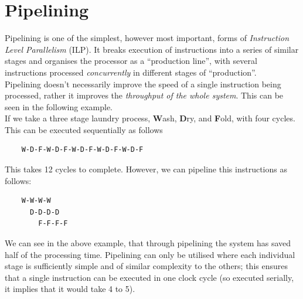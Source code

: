 
\section{Pipelining}
Pipelining is one of the simplest, however most important, forms of \textit{Instruction Level Parallelism} (ILP). It breaks execution of instructions into a series of similar stages and organises the processor as a ``production line'', with several instructions processed \textit{concurrently} in different stages of ``production''.\\

Pipelining doesn't necessarily improve the speed of a single instruction being processed, rather it improves the \textit{throughput of the whole system}. This can be seen in the following example.\\

If we take a three stage laundry process, \textbf{W}ash, \textbf{D}ry, and \textbf{F}old, with four cycles. This can be executed sequentially as follows
\begin{verbatim}
    W-D-F-W-D-F-W-D-F-W-D-F-W-D-F
\end{verbatim}
This takes 12 cycles to complete. However, we can pipeline this instructions as follows:
\begin{verbatim}
    W-W-W-W
      D-D-D-D
        F-F-F-F
\end{verbatim}
We can see in the above example, that through pipelining the system has saved half of the processing time. Pipelining can only be utilised where each individual stage is sufficiently simple and of similar complexity to the others; this ensures that a single instruction can be executed in one clock cycle (so executed serially, it implies that it would take 4 to 5).

